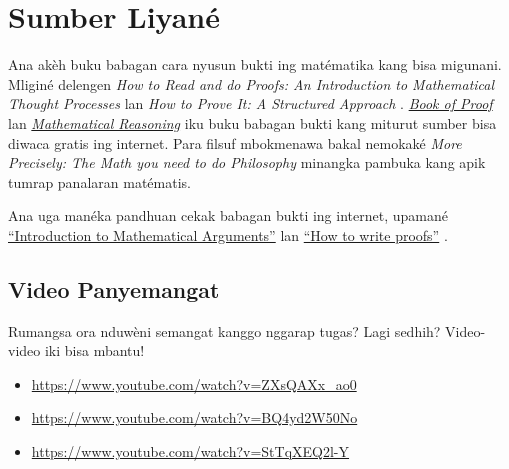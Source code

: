 \documentclass[../../../include/open-logic-section]{subfiles}
\begin{document}

\section{Sumber Liyané}

Ana akèh buku babagan cara nyusun bukti ing matématika
kang bisa migunani. Mliginé delengen
\emph{How to Read and do Proofs: An Introduction to
Mathematical Thought Processes} \citep{Solow2013}
lan \emph{How to
Prove It: A Structured Approach} \citep{Velleman2019}.
\href{http://www.people.vcu.edu/~rhammack/BookOfProof/BookOfProof.pdf}{\emph{Book
of Proof}} \citep{Hammack2013} lan
\href{https://scholarworks.gvsu.edu/books/7/}{\emph{Mathematical
Reasoning}} \citep{Sandstrum2019} iku buku babagan
bukti kang miturut sumber bisa diwaca gratis ing internet.
Para filsuf mbokmenawa bakal nemokaké
\emph{More
Precisely: The Math you need to do Philosophy}
\citep{Steinhart2018} minangka pambuka kang
apik tumrap panalaran matématis.

Ana uga manéka pandhuan cekak babagan bukti
ing internet, upamané
\href{https://math.berkeley.edu/~hutching/teach/proofs.pdf}{``Introduction
  to Mathematical Arguments''} \citep{Hutchings2003}
lan
\href{https://eugeniacheng.com/wp-content/uploads/2017/02/cheng-proofguide.pdf}{``How to
  write proofs''} \citep{Cheng2004}.

\subsection{Video Panyemangat}

Rumangsa ora nduwèni semangat kanggo nggarap
tugas? Lagi sedhih? Video-video iki bisa mbantu!

\begin{itemize}
\item \url{https://www.youtube.com/watch?v=ZXsQAXx_ao0}
\item \url{https://www.youtube.com/watch?v=BQ4yd2W50No}
\item \url{https://www.youtube.com/watch?v=StTqXEQ2l-Y}
\end{itemize}
\end{document}
